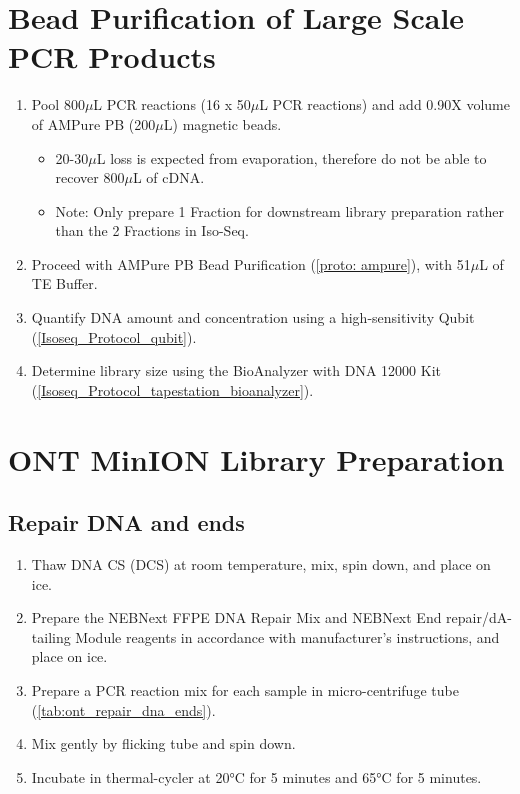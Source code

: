 \section{Bead Purification of Large Scale PCR Products}
\label{ONT_Protocol_Bead_Purification}
\begin{enumerate}
	\item Pool 800$\mu$L PCR reactions (16 x 50$\mu$L PCR reactions) and add 0.90X volume of AMPure PB (200$\mu$L) magnetic beads. 
	\begin{itemize}
		\item 20-30$\mu$L loss is expected from evaporation, therefore do not be able to recover 800$\mu$L of cDNA.
		\item Note: Only prepare 1 Fraction for downstream library preparation rather than the 2 Fractions in Iso-Seq.
	\end{itemize}
	\item Proceed with AMPure PB Bead Purification (\cref{proto: ampure}), with 51$\mu$L of TE Buffer.
	\item Quantify DNA amount and concentration using a high-sensitivity Qubit (\cref{Isoseq_Protocol_qubit}).
	\item Determine library size using the BioAnalyzer with DNA 12000 Kit (\cref{Isoseq_Protocol_tapestation_bioanalyzer}). 
\end{enumerate}

\section{ONT MinION Library Preparation}
\subsection{Repair DNA and ends}
\begin{enumerate}
	\item Thaw DNA CS (DCS) at room temperature, mix, spin down, and place on ice.
	\item Prepare the NEBNext FFPE DNA Repair Mix and NEBNext End repair/dA-tailing Module reagents in accordance with manufacturer’s instructions, and place on ice.
	\item Prepare a PCR reaction mix for each sample in micro-centrifuge tube (\cref{tab:ont_repair_dna_ends}).
	\item Mix gently by flicking tube and spin down. 
	\item Incubate in thermal-cycler at 20°C for 5 minutes and 65°C for 5 minutes.
\end{enumerate}

